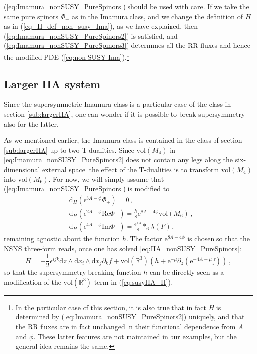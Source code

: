 \documentclass[12pt]{article}
\newcommand{\R}{\mathbb{R}}
\renewcommand{\Re}{\mathrm{Re}}
\renewcommand{\Im}{\mathrm{Im}}
\newcommand{\dd}{\mathrm{d}}
\newcommand{\e}{\mathrm{e}}
\newcommand{\vol}{\mathrm{vol}}
\begin{document}
 (\ref{eq:Imamura_nonSUSY_PureSpinors}) should be used with care. If we take the same pure spinors $\Phi_\pm$ as in the Imamura class, and we change the definition of $H$ as in (\ref{eq_H_def_non_susy_Ima}), as we have explained, then (\ref{eq:Imamura_nonSUSY_PureSpinors2}) is satisfied, and (\ref{eq:Imamura_nonSUSY_PureSpinors3}) determines all the RR fluxes and hence the modified PDE (\ref{eq:non-SUSY-Ima}).\footnote{In the particular case of this section, it is also true that in fact $H$ is determined by (\ref{eq:Imamura_nonSUSY_PureSpinors2}) uniquely, and that the RR fluxes are in fact unchanged in their functional dependence from $A$ and $\phi$. These latter features are not maintained in our examples, but the general idea remains the same.}



\subsection{Larger IIA system} \label{sub:iia_no_S2}

Since the supersymmetric Imamura class is a particular case of the class in section \ref{sub:largerIIA}, one can wonder if it is possible to break supersymmetry also for the latter. 

As we mentioned earlier, the Imamura class is contained in the class of section \ref{sub:largerIIA} up to two T-dualities. Since $\vol(M_4)$ in \eqref{eq:Imamura_nonSUSY_PureSpinors2} does not contain any legs along the six-dimensional external space, the effect of the T-dualities is to transform $\vol(M_4)$ into $\vol(M_6)$. For now, we will simply assume that (\ref{eq:Imamura_nonSUSY_PureSpinors}) is modified to
\begin{subequations}
	\label{eq:IIA_nonSUSY_PureSpinors}
	\begin{align}
	&\dd_H ( \e^{3A-\phi} \Phi_+) = 0 \, ,\\
	&\dd_H( \e^{2A-\phi} \Re\Phi_-) = \frac{h}{8} \e^{8A-4 \phi} \vol(M_6) \, , \label{eq:IIA_nonSUSY_PureSpinors2} \\
	&\dd_H ( \e^{4A-\phi}\Im\Phi_-) = \frac{\e^{4A}}{8} *_6 \lambda(F) \, , \label{eq:IIA_nonSUSY_PureSpinors3} 
	\end{align}
\end{subequations} 
remaining agnostic about the function $h$. The factor $\e^{8A-4 \phi}$ is chosen so that the NSNS three-form reads, once one has solved \eqref{eq:IIA_nonSUSY_PureSpinors}:
\begin{equation}\label{eq:H_larger}
H= - \frac{1}{2} \epsilon^{ijk} \dd z \wedge \dd x_i \wedge \dd x_j \partial_k f + \vol(\R^3) (h+\e^{-\mu}  \partial_z (\e^{-4A-\mu} f)) \, ,
\end{equation}
so that the supersymmetry-breaking function $h$ can be directly seen as a modification of the $\mathrm{vol}(\R^3)$ term in (\ref{eq:susyIIA_H}). 
\end{document}

